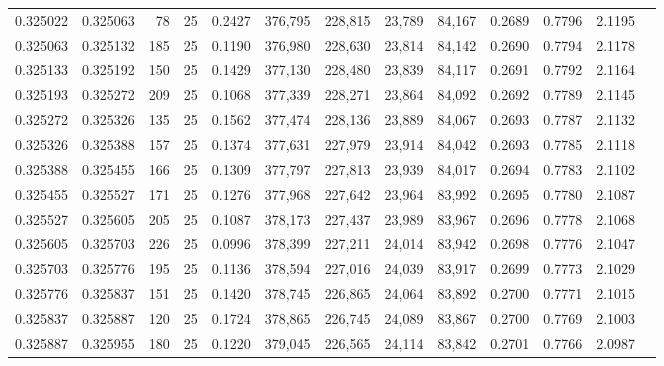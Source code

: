 \begin{tabular}{rrrrrrrrrrrrr}
0.325022 & 0.325063 &    78 &  25 &                                     0.2427 & 376,795 & 228,815 &  23,789 &  84,167 & 0.2689 & 0.7796 & 2.1195 \\
0.325063 & 0.325132 &   185 &  25 &                                     0.1190 & 376,980 & 228,630 &  23,814 &  84,142 & 0.2690 & 0.7794 & 2.1178 \\
0.325133 & 0.325192 &   150 &  25 &                                     0.1429 & 377,130 & 228,480 &  23,839 &  84,117 & 0.2691 & 0.7792 & 2.1164 \\
0.325193 & 0.325272 &   209 &  25 &                                     0.1068 & 377,339 & 228,271 &  23,864 &  84,092 & 0.2692 & 0.7789 & 2.1145 \\
0.325272 & 0.325326 &   135 &  25 &                                     0.1562 & 377,474 & 228,136 &  23,889 &  84,067 & 0.2693 & 0.7787 & 2.1132 \\
0.325326 & 0.325388 &   157 &  25 &                                     0.1374 & 377,631 & 227,979 &  23,914 &  84,042 & 0.2693 & 0.7785 & 2.1118 \\
0.325388 & 0.325455 &   166 &  25 &                                     0.1309 & 377,797 & 227,813 &  23,939 &  84,017 & 0.2694 & 0.7783 & 2.1102 \\
0.325455 & 0.325527 &   171 &  25 &                                     0.1276 & 377,968 & 227,642 &  23,964 &  83,992 & 0.2695 & 0.7780 & 2.1087 \\
0.325527 & 0.325605 &   205 &  25 &                                     0.1087 & 378,173 & 227,437 &  23,989 &  83,967 & 0.2696 & 0.7778 & 2.1068 \\
0.325605 & 0.325703 &   226 &  25 &                                     0.0996 & 378,399 & 227,211 &  24,014 &  83,942 & 0.2698 & 0.7776 & 2.1047 \\
0.325703 & 0.325776 &   195 &  25 &                                     0.1136 & 378,594 & 227,016 &  24,039 &  83,917 & 0.2699 & 0.7773 & 2.1029 \\
0.325776 & 0.325837 &   151 &  25 &                                     0.1420 & 378,745 & 226,865 &  24,064 &  83,892 & 0.2700 & 0.7771 & 2.1015 \\
0.325837 & 0.325887 &   120 &  25 &                                     0.1724 & 378,865 & 226,745 &  24,089 &  83,867 & 0.2700 & 0.7769 & 2.1003 \\
0.325887 & 0.325955 &   180 &  25 &                                     0.1220 & 379,045 & 226,565 &  24,114 &  83,842 & 0.2701 & 0.7766 & 2.0987 \\

\end{tabular}
